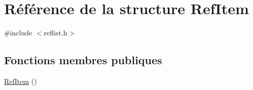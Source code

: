 \hypertarget{struct_ref_item}{}\section{Référence de la structure Ref\+Item}
\label{struct_ref_item}


{\ttfamily \#include $<$reflist.\+h$>$}

\subsection*{Fonctions membres publiques}
\begin{DoxyCompactItemize}
\item 
\hyperlink{struct_ref_item_a756457beb7f98a2b5cb1852b093674bb}{Ref\+Item} ()
\end{DoxyCompactItemize}
